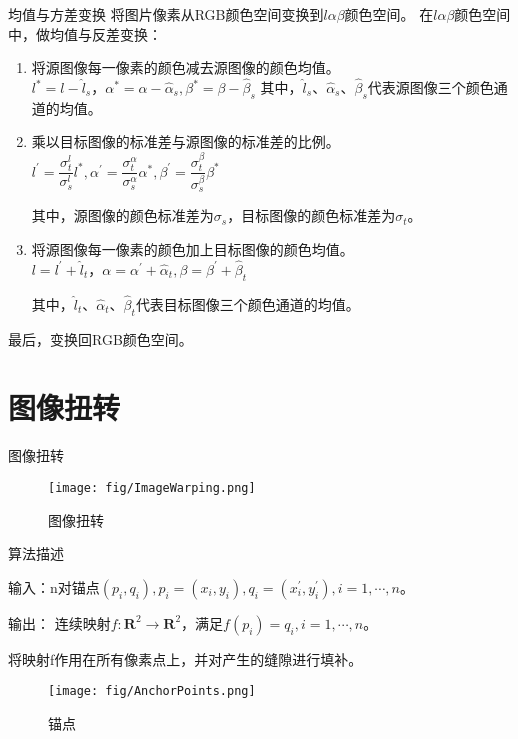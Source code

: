 \documentclass[10.5pt]{beamer}
\begin{document}
\begin{frame}{均值与方差变换}
将图片像素从RGB颜色空间变换到$l \alpha \beta$颜色空间。
在$l \alpha \beta$颜色空间中，做均值与反差变换：
\begin{enumerate}
\item 将源图像每一像素的颜色减去源图像的颜色均值。
    $l^{*} = l - \hat{l}_{s}，\alpha^{*} = \alpha - \hat{\alpha}_{s},\beta^{*} = \beta  - \hat{\beta}_{s}$
    其中，$\hat{l}_{s}$、$\hat{\alpha}_{s}$、$\hat{\beta}_{s}$代表源图像三个颜色通道的均值。
    
\item 乘以目标图像的标准差与源图像的标准差的比例。
    $l^{'} = \dfrac{\sigma_{t}^{l}}{\sigma_{s}^{l} }l^{*},\alpha^{'} = \dfrac{\sigma_{t}^{\alpha}}{\sigma_{s}^{\alpha}} \alpha^{*},\beta^{'} = \dfrac{\sigma_{t}^{\beta}}{\sigma_{s}^{\beta} }\beta^{*}$

    其中，源图像的颜色标准差为$\sigma_{s}$，目标图像的颜色标准差为$\sigma_{t}$。
\item  将源图像每一像素的颜色加上目标图像的颜色均值。
    $l = l^{'} + \hat{l}_{t}，\alpha = \alpha^{'} + \hat{\alpha}_{t},\beta = \beta^{'}  + \hat{\beta}_{t}$

  其中，$\hat{l}_{t}$、$\hat{\alpha}_{t}$、$\hat{\beta}_{t}$代表目标图像三个颜色通道的均值。
\end{enumerate}

最后，变换回RGB颜色空间。

\end{frame}



\section{图像扭转}
\begin{frame}{图像扭转}
\begin{figure}[!t]
\centering
\texttt{[image: fig/ImageWarping.png]}
\caption{图像扭转}
\label{fig_2}
\end{figure}
\end{frame}

\begin{frame}{算法描述}
\begin{block}{}
输入：n对锚点$(p_{i},q_{i}),p_{i}= (x_{i},y_{i}),q_{i} = (x^{'}_{i},y^{'}_{i}),i = 1,\cdots,n$。

输出： 连续映射$f: \mathbf{R}^{2} \rightarrow \mathbf{R}^{2}$，满足$f(p_{i}) = q_{i},i = 1,\cdots,n$。

将映射f作用在所有像素点上，并对产生的缝隙进行填补。
\end{block}

\begin{figure}[!t]
\centering
\texttt{[image: fig/AnchorPoints.png]}
\caption{锚点}
\label{fig_3}
\end{figure}
\end{frame}
\end{document}
